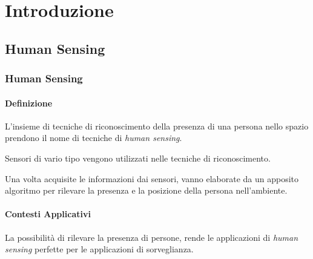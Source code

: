 
\chapter{Introduzione}
\label{chap:introduction}
    \section{Human Sensing}
    \label{sec:human_sensing}
        \subsection{Human Sensing}
            \subsubsection{Definizione}
                L'insieme di tecniche di riconoscimento della presenza di una persona nello spazio prendono il nome di tecniche di \emph{human sensing}.

                Sensori di vario tipo vengono utilizzati nelle tecniche di riconoscimento.

                Una volta acquisite le informazioni dai sensori, vanno elaborate da un apposito algoritmo per rilevare la presenza e la posizione della persona nell'ambiente.

            \subsubsection{Contesti Applicativi}
                La possibilità di rilevare la presenza di persone, rende le applicazioni di \emph{human sensing} perfette per le applicazioni di sorveglianza.

